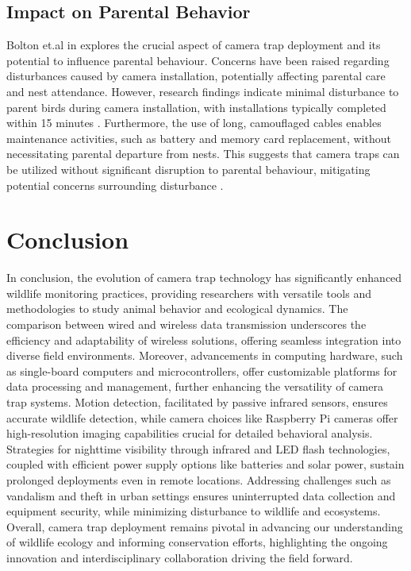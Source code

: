 \documentclass[class=report,11pt,crop=false]{standalone}
\begin{document}
\subsection{Impact on Parental Behavior}
Bolton et.al in \cite{bolton2007remote} explores the crucial aspect of camera trap deployment and its potential to influence parental behaviour. Concerns have been raised regarding disturbances caused by camera installation, potentially affecting parental care and nest attendance. However, research findings indicate minimal disturbance to parent birds during camera installation, with installations typically completed within 15 minutes \cite{bolton2007remote}. Furthermore, the use of long, camouflaged cables enables maintenance activities, such as battery and memory card replacement, without necessitating parental departure from nests. This suggests that camera traps can be utilized without significant disruption to parental behaviour, mitigating potential concerns surrounding disturbance \cite{bolton2007remote}.

\section{Conclusion}

In conclusion, the evolution of camera trap technology has significantly enhanced wildlife monitoring practices, providing researchers with versatile tools and methodologies to study animal behavior and ecological dynamics. The comparison between wired and wireless data transmission underscores the efficiency and adaptability of wireless solutions, offering seamless integration into diverse field environments. Moreover, advancements in computing hardware, such as single-board computers and microcontrollers, offer customizable platforms for data processing and management, further enhancing the versatility of camera trap systems. Motion detection, facilitated by passive infrared sensors, ensures accurate wildlife detection, while camera choices like Raspberry Pi cameras offer high-resolution imaging capabilities crucial for detailed behavioral analysis. Strategies for nighttime visibility through infrared and LED flash technologies, coupled with efficient power supply options like batteries and solar power, sustain prolonged deployments even in remote locations. Addressing challenges such as vandalism and theft in urban settings ensures uninterrupted data collection and equipment security, while minimizing disturbance to wildlife and ecosystems. Overall, camera trap deployment remains pivotal in advancing our understanding of wildlife ecology and informing conservation efforts, highlighting the ongoing innovation and interdisciplinary collaboration driving the field forward.

\ifstandalone

\printnoidxglossary[type=\acronymtype,nonumberlist]
\fi
\end{document}
